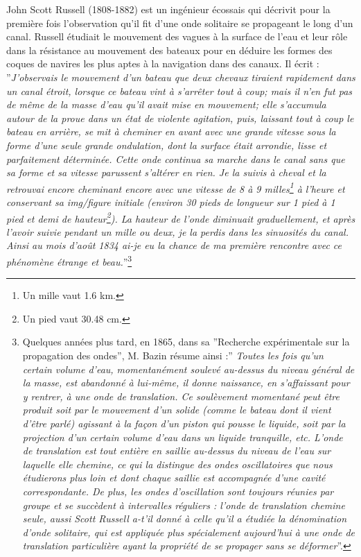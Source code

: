 \documentclass[10pt,thmsa]{article}
\begin{document}
John Scott Russell (1808-1882) est un ing\'{e}nieur \'{e}cossais qui
d\'{e}crivit pour la premi\`{e}re fois l'observation qu'il fit d'une onde
solitaire se propageant le long d'un canal. Russell \'{e}tudiait le mouvement
des vagues \`{a} la surface de l'eau et leur r\^{o}le dans la r\'{e}sistance
au mouvement des bateaux pour en d\'{e}duire les formes des coques de navires
les plus aptes \`{a} la navigation dans des canaux. Il \'{e}crit :
''\textit{J'observais le mouvement d'un bateau que deux chevaux tiraient
rapidement dans un canal \'{e}troit, lorsque ce bateau vint \`{a}
s'arr\^{e}ter tout \`{a} coup; mais il n'en fut pas de m\^{e}me de la masse
d'eau qu'il avait mise en mouvement; elle s'accumula autour de la proue dans
un \'{e}tat de violente agitation, puis, laissant tout \`{a} coup le bateau en
arri\`{e}re, se mit \`{a} cheminer en avant avec une grande vitesse sous la
forme d'une seule grande ondulation, dont la surface \'{e}tait arrondie, lisse
et parfaitement d\'{e}termin\'{e}e. Cette onde continua sa marche dans le
canal sans que sa forme et sa vitesse parussent s'alt\'{e}rer en rien. Je la
suivis \`{a} cheval et la retrouvai encore cheminant encore avec une vitesse
de 8 \`{a} 9 milles\footnote{Un mille vaut 1.6 km.} \`{a} l'heure et
conservant sa img/figure initiale (environ 30 pieds de longueur sur 1 pied \`{a} 1
pied et demi de hauteur\footnote{Un pied vaut 30.48 cm.}). La hauteur de
l'onde diminuait graduellement, et apr\`{e}s l'avoir suivie pendant un mille
ou deux, je la perdis dans les sinuosit\'{e}s du canal. Ainsi au mois
d'ao\^{u}t 1834 ai-je eu la chance de ma premi\`{e}re rencontre avec ce
ph\'{e}nom\`{e}ne \'{e}trange et beau.}''\footnote{Quelques ann\'{e}es plus
tard, en 1865, dans sa ''Recherche exp\'{e}rimentale sur la propagation des
ondes'', M. Bazin r\'{e}sume ainsi :'' \textit{Toutes les fois qu'un certain
volume d'eau, momentan\'{e}ment soulev\'{e} au-dessus du niveau
g\'{e}n\'{e}ral de la masse, est abandonn\'{e} \`{a} lui-m\^{e}me, il donne
naissance, en s'affaissant pour y rentrer, \`{a} une onde de translation. Ce
soul\`{e}vement momentan\'{e} peut \^{e}tre produit soit par le mouvement d'un
solide (comme le bateau dont il vient d'\^{e}tre parl\'{e}) agissant \`{a} la
fa\c{c}on d'un piston qui pousse le liquide, soit par la projection d'un
certain volume d'eau dans un liquide tranquille, etc. L'onde de translation
est tout enti\`{e}re en saillie au-dessus du niveau de l'eau sur laquelle elle
chemine, ce qui la distingue des ondes oscillatoires que nous \'{e}tudierons
plus loin et dont chaque saillie est accompagn\'{e}e d'une cavit\'{e}
correspondante. De plus, les ondes d'oscillation sont toujours r\'{e}unies par
groupe et se succ\`{e}dent \`{a} intervalles r\'{e}guliers : l'onde de
translation chemine seule, aussi Scott Russell a-t'il donn\'{e} \`{a} celle
qu'il a \'{e}tudi\'{e}e la d\'{e}nomination d'onde solitaire, qui est
appliqu\'{e}e plus sp\'{e}cialement aujourd'hui \`{a} une onde de translation
particuli\`{e}re ayant la propri\'{e}t\'{e} de se propager sans se
d\'{e}former}''.}
\end{document}
